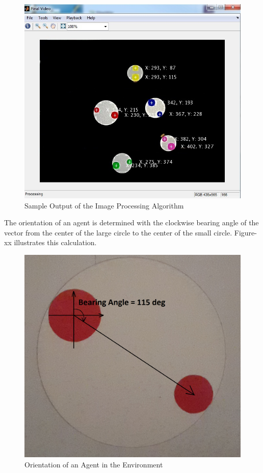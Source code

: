\documentclass[twoside]{article}
\begin{document}
		
		\begin{figure}[H]
			\caption{Sample Output of the Image Processing Algorithm}
			\centerline{\includegraphics[scale = 0.50]{Image_Processing}}
		\end{figure} 
		
		The orientation of an agent is determined with the clockwise bearing angle of the vector from the center of the large circle to the center of the small circle. Figure-xx illustrates this calculation.
		
				\begin{figure}[H]
					\caption{Orientation of an Agent in the Environment}
					\centerline{\includegraphics[scale = 0.20]{Bearing_Angle}}
				\end{figure} 
		
\end{document}
